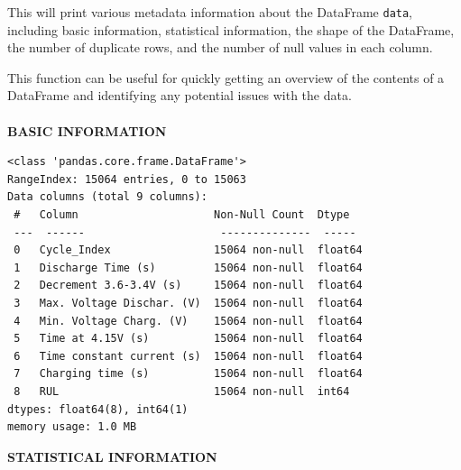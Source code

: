 This will print various metadata information about the DataFrame \texttt{data}, including basic 
information, statistical information, the shape of the DataFrame, the number of duplicate 
rows, and the number of null values in each column. 

This function can be useful for quickly getting an overview of the contents of a DataFrame and 
identifying any potential issues with the data.
\\
\\
\noindent
\textbf{BASIC INFORMATION}
\begin{adjustbox}{\textwidth}
\begin{verbatim}
<class 'pandas.core.frame.DataFrame'> 
RangeIndex: 15064 entries, 0 to 15063 
Data columns (total 9 columns): 
 #   Column                     Non-Null Count  Dtype   
 ---  ------                     --------------  -----   
 0   Cycle_Index                15064 non-null  float64 
 1   Discharge Time (s)         15064 non-null  float64 
 2   Decrement 3.6-3.4V (s)     15064 non-null  float64 
 3   Max. Voltage Dischar. (V)  15064 non-null  float64 
 4   Min. Voltage Charg. (V)    15064 non-null  float64 
 5   Time at 4.15V (s)          15064 non-null  float64 
 6   Time constant current (s)  15064 non-null  float64 
 7   Charging time (s)          15064 non-null  float64 
 8   RUL                        15064 non-null  int64   
dtypes: float64(8), int64(1) 
memory usage: 1.0 MB 
\end{verbatim}
\end{adjustbox}
\vspace{0.35in}
\noindent
\textbf{STATISTICAL INFORMATION}

